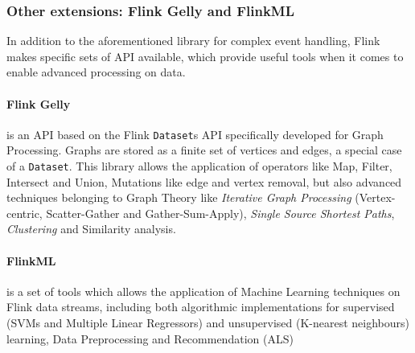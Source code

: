 \subsubsection{Other extensions: Flink Gelly and FlinkML}

In addition to the aforementioned library for complex event handling, Flink makes specific sets of API available, which provide useful tools when it comes to enable advanced processing on data.

\paragraph{Flink Gelly} is an API based on the Flink \verb|Dataset|s API specifically developed for Graph Processing. Graphs are stored as a finite set of vertices and edges, a special case of a \verb|Dataset|. This library allows the application of operators like Map, Filter, Intersect and Union, Mutations like edge and vertex removal, but also advanced techniques belonging to Graph Theory like \textit{Iterative Graph Processing} (Vertex-centric, Scatter-Gather and Gather-Sum-Apply), \textit{Single Source Shortest Paths}, \textit{Clustering} and Similarity analysis.

\paragraph{FlinkML} is a set of tools which allows the application of Machine Learning techniques on Flink data streams, including both algorithmic implementations for supervised (SVMs and Multiple Linear Regressors) and unsupervised (K-nearest neighbours) learning, Data Preprocessing and Recommendation (ALS)


